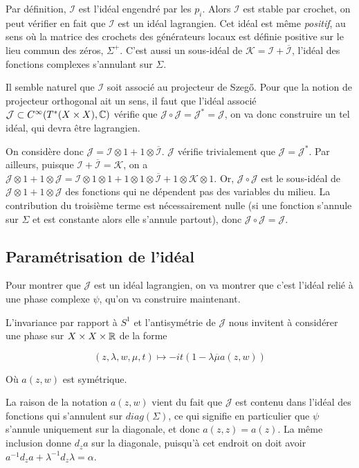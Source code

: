Par définition, $\mathcal{I}$ est l'idéal engendré par les $p_i$. Alors $\mathcal{I}$ est stable par crochet, on peut vérifier en fait que $\mathcal{I}$ est un idéal lagrangien. Cet idéal est même \emph{positif}, au sens où la matrice des crochets des générateurs locaux est définie positive sur le lieu commun des zéros, $\Sigma^+$. C'est aussi un sous-idéal de $\mathcal{K}=\mathcal{I} + \overline{\mathcal{I}}$, l'idéal des fonctions complexes s'annulant sur $\Sigma$. 

Il semble naturel que $\mathcal{I}$ soit associé au projecteur de Szeg\H{o}. Pour que la notion de projecteur orthogonal ait un sens, il faut que l'idéal associé $\mathcal{J} \subset C^{\infty}(T^*(X\times X), \mathbb{C})$ vérifie que $\mathcal{J} \circ \mathcal{J} = \mathcal{J}^*=\mathcal{J}$, on va donc construire un tel idéal, qui devra être lagrangien.

On considère donc $\mathcal{J} = \mathcal{I} \otimes 1 + 1 \otimes \overline{\mathcal{I}}$. $\mathcal{J}$ vérifie trivialement que $\mathcal{J}=\mathcal{J}^*$. Par ailleurs, puisque $\mathcal{I} + \overline{\mathcal{I}}=\mathcal{K}$, on a $\mathcal{J} \otimes 1 + 1 \otimes \mathcal{J} = \mathcal{I} \otimes 1 \otimes 1 + 1 \otimes 1 \otimes \overline{\mathcal{I}} + 1 \otimes \mathcal{K} \otimes 1$. Or, $\mathcal{J} \circ \mathcal{J}$ est le sous-idéal de $\mathcal{J} \otimes 1 + 1 \otimes \mathcal{J}$ des fonctions qui ne dépendent pas des variables du milieu. La contribution du troisième terme est nécessairement nulle (si une fonction s'annule sur $\Sigma$ et est constante alors elle s'annule partout), donc $\mathcal{J} \circ \mathcal{J} = \mathcal{J}$.

\subsection{Paramétrisation de l'idéal}
Pour montrer que $\mathcal{J}$ est un idéal lagrangien, on va montrer que c'est l'idéal relié à une phase complexe $\psi$, qu'on va construire maintenant.

L'invariance par rapport à $S^1$ et l'antisymétrie de $\mathcal{J}$ nous invitent à considérer une phase sur $X \times X \times \mathbb{R}$ de la forme

\begin{equation*}
	(z, \lambda ,w, \mu ,t) \mapsto -it(1-\lambda \overline{\mu}a(z,w))
\end{equation*}

Où $a(z,w)$ est symétrique.

La raison de la notation $a(z,w)$ vient du fait que $\mathcal{J}$ est contenu dans l'idéal des fonctions qui s'annulent sur $diag(\Sigma)$, ce qui signifie en particulier que $\psi$ s'annule uniquement sur la diagonale, et donc $a(z,z)=a(z)$. La même inclusion donne $d_za$ sur la diagonale, puisqu'à cet endroit on doit avoir $a^{-1}d_za + \lambda^{-1}d_z \lambda = \alpha$.

